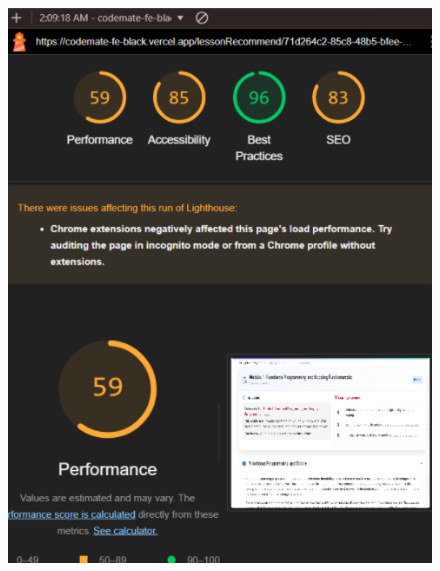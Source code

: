 \begin{figure}[H]
\begin{minipage}{0.45\textwidth}
  \centering
  \includegraphics[width=\linewidth]{images/lighthouse_detail_module.png}
\end{minipage}
\hfill
\begin{minipage}{0.45\textwidth}
  \centering

\end{minipage}
\end{figure}
